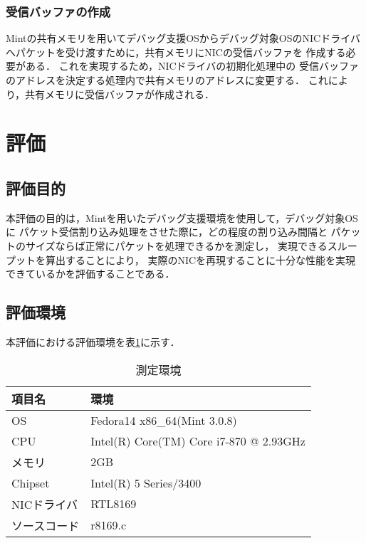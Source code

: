 \documentclass[submit,techreq,noauthor,dvipdfmx]{ipsj}
\begin{document}
\subsubsection*{受信バッファの作成}\label{sec:creating_recieving_buffer}

Mintの共有メモリを用いてデバッグ支援OSからデバッグ対象OSのNICドライバ
へパケットを受け渡すために，共有メモリにNICの受信バッファを
作成する必要がある．
これを実現するため，NICドライバの初期化処理中の
受信バッファのアドレスを決定する処理内で共有メモリのアドレスに変更する．
これにより，共有メモリに受信バッファが作成される．

\section{評価}\label{chap:evaluation}

\subsection{評価目的}

本評価の目的は，Mintを用いたデバッグ支援環境を使用して，デバッグ対象OSに
パケット受信割り込み処理をさせた際に，どの程度の割り込み間隔と
パケットのサイズならば正常にパケットを処理できるかを測定し，
実現できるスループットを算出することにより，
実際のNICを再現することに十分な性能を実現できているかを評価することである．

\subsection{評価環境}

本評価における評価環境を表\ref{environment}に示す．

\begin{table}[h]
    \caption{測定環境}
    \label{environment}
    \begin{center}
        \begin{tabular}{l|l}   \hline \hline 
            項目名      & 環境                                    \\ \hline
            OS          & Fedora14 x86\_64(Mint 3.0.8)            \\ 
            CPU         & Intel(R) Core(TM) Core i7-870 @ 2.93GHz \\
            メモリ      & 2GB                                     \\
            Chipset     & Intel(R) 5 Series/3400                  \\
            NICドライバ & RTL8169                                 \\ 
            ソースコード& r8169.c                                 \\ \hline
        \end{tabular}
    \end{center}
\end{table}
\end{document}
